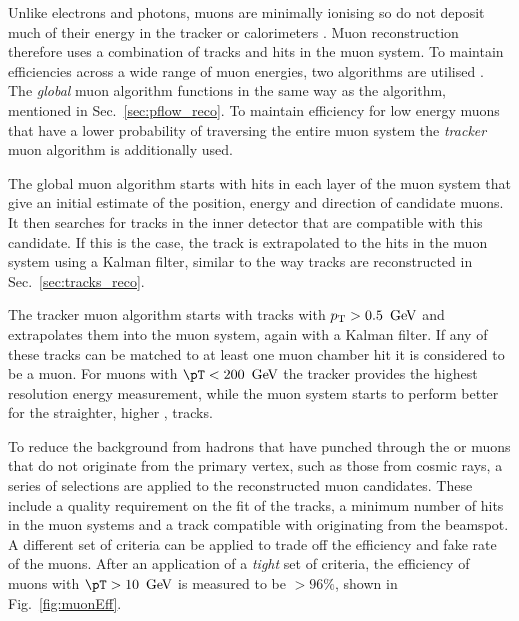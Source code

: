 Unlike electrons and photons, muons are minimally ionising so do not
deposit much of their energy in the tracker or calorimeters
\cite{Chatrchyan:2008aa}. Muon reconstruction therefore
uses a combination of tracks and hits in the muon system. To maintain
efficiencies across a wide range of muon energies, two algorithms are
utilised \cite{1748-0221-7-10-P10002}. The \emph{global} muon algorithm
functions in the same way as the \PF algorithm, mentioned in
Sec.~\ref{sec:pflow_reco}. To maintain efficiency for low energy muons
that have a lower probability of traversing the entire muon system
the \emph{tracker} muon algorithm is additionally used.

The global muon algorithm starts with hits in each layer of the muon
system that give an initial estimate of the position, energy and
direction of candidate muons. It then searches for tracks in the inner
detector that are compatible with this candidate. If this is the case,
the track is extrapolated to the hits in the muon system using a
Kalman filter, similar to the way tracks are reconstructed in
Sec.~\ref{sec:tracks_reco}. 

The tracker muon algorithm starts with tracks with ${p_{\text T}}>0.5~\mathrm{\,Ge\kern -0.1em V}$ and
extrapolates them into the muon system, again with a Kalman filter. If
any of these tracks can be matched to at least one muon chamber hit it
is considered to be a muon. For muons with $\pT<200~\gev$ the tracker
provides the highest resolution energy measurement, while the muon
system starts to perform better for the straighter, higher \pT,
tracks.

To reduce the background from hadrons that have punched through the
\HCAL or muons that do not originate from the primary vertex, such as
those from cosmic
rays, a series of selections are applied to the reconstructed
muon candidates. These include a quality requirement on the fit of the
tracks, a minimum number of hits in the muon systems and a track
compatible with originating from the beamspot. A different set of
criteria can be applied to trade off the efficiency and fake rate of
the muons. After an application of a \emph{tight} set of criteria, the
efficiency of muons with $\pT>10~\gev$ is measured to be $>96\%$,
shown in Fig.~\ref{fig:muonEff}.

